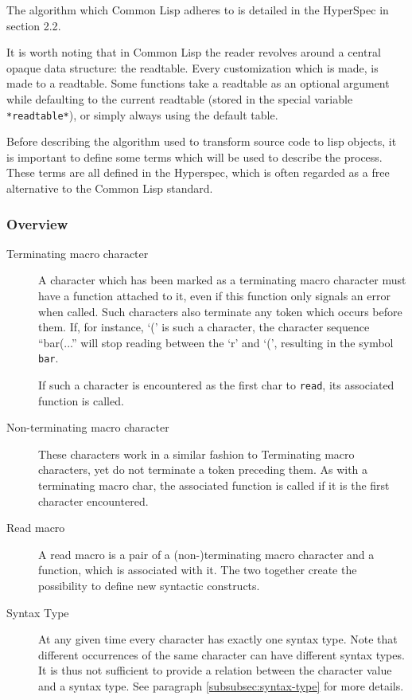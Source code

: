 \documentclass[a4paper,10pt,twoside]{article}
\newcommand{\cl}{Common Lisp}
\newcommand{\sym}[1]{\texttt{#1}}
\newcommand{\fun}[1]{\texttt{#1}}
\newcommand{\Read}{\fun{read}}
\begin{document}
The algorithm which \cl{} adheres to is detailed in the HyperSpec in section
2.2\cite{hyperspec}.

It is worth noting that in \cl{} the reader revolves around a central opaque
data structure: the readtable.  Every customization which is made, is made to a
readtable.  Some functions take a readtable as an optional argument while
defaulting to the current readtable (stored in the special variable
\sym{*readtable*}), or simply always using the default table.

Before describing the algorithm used to transform source code to lisp objects,
it is important to define some terms which will be used to describe the
process.  These terms are all defined in the Hyperspec, which is often regarded
as a free alternative to the \cl{} standard.

\subsubsection{Overview}
\label{subsubsec:terms-overview}

\begin{description}
\item[Terminating macro character] A character which has been marked as a
  terminating macro character must have a function attached to it, even if this
  function only signals an error when called.  Such characters also terminate
  any token which occurs before them.  If, for instance, `(' is such a
  character, the character sequence ``bar(...'' will stop reading between the
  `r' and `(', resulting in the symbol \sym{bar}.

  If such a character is encountered as the first char to \Read{}, its
  associated function is called.
\item[Non-terminating macro character] These characters work in a similar
  fashion to Terminating macro characters, yet do not terminate a token
  preceding them.  As with a terminating macro char, the associated function is
  called if it is the first character encountered.
\item [Read macro] A read macro is a pair of a (non-)terminating macro character
  and a function, which is associated with it.  The two together create the
  possibility to define new syntactic constructs.
\item[Syntax Type] At any given time every character has exactly one syntax
  type.  Note that different occurrences of the same character can have
  different syntax types.  It is thus not sufficient to provide a relation
  between the character value and a syntax type.  See paragraph
  \ref{subsubsec:syntax-type} for more details.
\end{description}
\end{document}
